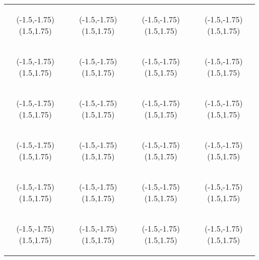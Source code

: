 \documentclass[12pt]{article}
\def\emptycube{
\begin{pspicture}(-1.5,-1.75)(1.5,1.75)
\lattice
\end{pspicture}
}
\begin{document}
\begin{tabular}{cccc}
\emptycube & \emptycube & \emptycube & \emptycube \\
\emptycube & \emptycube & \emptycube & \emptycube \\
\emptycube & \emptycube & \emptycube & \emptycube \\
\emptycube & \emptycube & \emptycube & \emptycube \\
\emptycube & \emptycube & \emptycube & \emptycube \\
\emptycube & \emptycube & \emptycube & \emptycube
\end{tabular}
\end{document}
